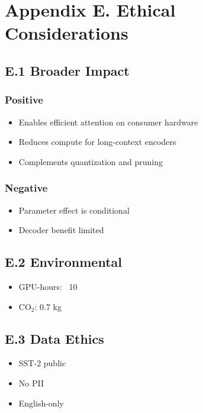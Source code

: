 \section{Appendix E. Ethical Considerations}

\subsection{E.1 Broader Impact}

\subsubsection{Positive}
\begin{itemize}
\item Enables efficient attention on consumer hardware
\item Reduces compute for long-context encoders
\item Complements quantization and pruning

\end{itemize}
\subsubsection{Negative}
\begin{itemize}
\item Parameter effect is conditional
\item Decoder benefit limited

\end{itemize}
\subsection{E.2 Environmental}

\begin{itemize}
\item GPU-hours: ~10
\item CO$_2$: 0.7 kg

\end{itemize}
\subsection{E.3 Data Ethics}

\begin{itemize}
\item SST-2 public
\item No PII
\item English-only

\end{itemize}
